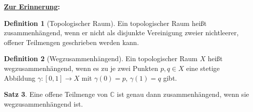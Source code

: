 \documentclass[11pt,titlepage]{article}
\theoremstyle{definition}
\newtheorem{theorem}{Satz}[section]
\newtheorem{definition}[theorem]{Definition}
\theoremstyle{remark}
\begin{document}
	\textbf{\underline{Zur Erinnerung}:}
	
	\begin{definition}[Topologischer Raum]
		Ein topologischer Raum heißt zusammenhängend, wenn er nicht als disjunkte Vereinigung zweier 
		nichtleerer, offener Teilmengen geschrieben werden kann.
	\end{definition}
	
	\begin{definition}[Wegzusammenhängend]
		Ein topologischer Raum $X$ heißt wegzusammenhängend, wenn es zu je zwei Punkten 
		$p,q\in X$ eine stetige Abbildung $\gamma :[0,1]\to X$ mit $\gamma (0)=p$, $\gamma (1)=q$ 
		gibt.
	\end{definition}
	
	\begin{theorem}
		Eine offene Teilmenge von $\mathbb{C}$ ist genau dann zusammenhängend, wenn sie 
		wegzusammenhängend ist.
	\end{theorem}
\end{document}
